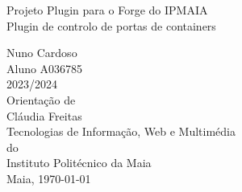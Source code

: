 \begin{titlepage}
\doublespacing


\centering
\vspace{5cm}
\huge Projeto Plugin para o Forge do IPMAIA\\
\vspace{1cm}
\large Plugin de controlo de portas de containers\\
\vspace{2cm}

\Large Nuno Cardoso\\Aluno A036785\\2023/2024\\
\vspace{2cm}
\large Orientação de\\
\large Cláudia Freitas\\
\vspace{1cm}
\normalsize Tecnologias de Informação, Web e Multimédia\\do\\
Instituto Politécnico da Maia\\
\vspace{1cm}
Maia, \daymonthyear\today \\
\vspace{1cm}
\end{titlepage}
